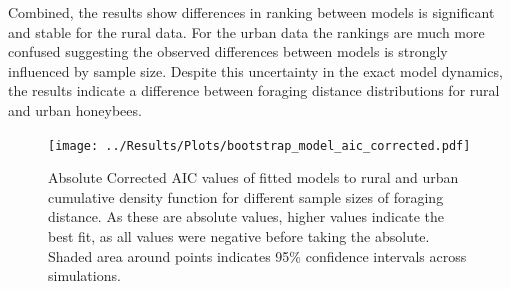 \documentclass[11pt]{article}
\begin{document}
\begin{linenumbers}
Combined, the results show differences in ranking between models is significant and stable for the rural data. For the urban data the rankings are much more confused suggesting the observed differences between models is strongly influenced by sample size. Despite this uncertainty in the exact model dynamics, the results indicate a difference between foraging distance distributions for rural and urban honeybees.  

\begin{figure}[H]
	\centering
	\texttt{[image: ../Results/Plots/bootstrap\_model\_aic\_corrected.pdf]}
	\caption{Absolute Corrected AIC values of fitted models to rural and urban cumulative density function for different sample sizes of foraging distance. As these are absolute values, higher values indicate the best fit, as all values were negative before taking the absolute. Shaded area around points indicates 95\% confidence intervals across simulations.}
\end{figure}

\end{linenumbers}
\end{document}
